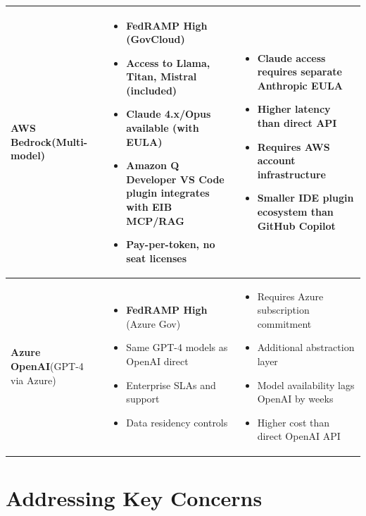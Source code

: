 \documentclass[11pt]{article}
\begin{document}
\begin{longtable}{@{}>{\raggedright}p{2.5cm}|p{5.5cm}|p{5.5cm}@{}}
\textbf{AWS Bedrock}\newline(Multi-model) &
\begin{itemize}[leftmargin=*, itemsep=1pt, topsep=0pt]
    \item \textbf{FedRAMP High} (GovCloud)
    \item Access to Llama, Titan, Mistral (included)
    \item Claude 4.x/Opus available (with EULA)
    \item Amazon Q Developer VS Code plugin integrates with EIB MCP/RAG
    \item Pay-per-token, no seat licenses
\end{itemize} &
\begin{itemize}[leftmargin=*, itemsep=1pt, topsep=0pt]
    \item Claude access requires separate Anthropic EULA
    \item Higher latency than direct API
    \item Requires AWS account infrastructure
    \item Smaller IDE plugin ecosystem than GitHub Copilot
\end{itemize} \\
\midrule

\textbf{Azure OpenAI}\newline(GPT-4 via Azure) &
\begin{itemize}[leftmargin=*, itemsep=1pt, topsep=0pt]
    \item \textbf{FedRAMP High} (Azure Gov)
    \item Same GPT-4 models as OpenAI direct
    \item Enterprise SLAs and support
    \item Data residency controls
\end{itemize} &
\begin{itemize}[leftmargin=*, itemsep=1pt, topsep=0pt]
    \item Requires Azure subscription commitment
    \item Additional abstraction layer
    \item Model availability lags OpenAI by weeks
    \item Higher cost than direct OpenAI API
\end{itemize} \\
\bottomrule
\end{longtable}

\section*{Addressing Key Concerns}
\end{document}
